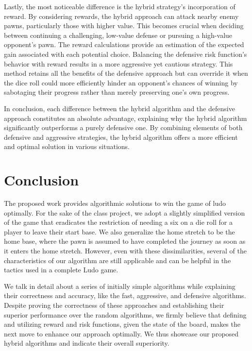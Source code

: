 \documentclass{article} %
\begin{document}
Lastly, the most noticeable difference is the hybrid strategy's incorporation of reward. By considering rewards, the hybrid approach can attack nearby enemy pawns, particularly those with higher value. This becomes crucial when deciding between continuing a challenging, low-value defense or pursuing a high-value opponent's pawn. The reward calculations provide an estimation of the expected gain associated with each potential choice. Balancing the defensive risk function's behavior with reward results in a more aggressive yet cautious strategy. This method retains all the benefits of the defensive approach but can override it when the dice roll could more efficiently hinder an opponent's chances of winning by sabotaging their progress rather than merely preserving one's own progress.

In conclusion, each difference between the hybrid algorithm and the defensive approach constitutes an absolute advantage, explaining why the hybrid algorithm significantly outperforms a purely defensive one. By combining elements of both defensive and aggressive strategies, the hybrid algorithm offers a more efficient and optimal solution in various situations.




\section{Conclusion}
The proposed work provides algorithmic solutions to win the game of ludo optimally. For the sake of the class project, we adopt a slightly simplified version of the game that eradicates the restriction of needing a six on a die roll for a player to leave their start base. We also generalize the home stretch to be the home base, where the pawn is assumed to have completed the journey as soon as it enters the home stretch. However, even with these dissimilarities, several of the characteristics of our algorithm are still applicable and can be helpful in the tactics used in a complete Ludo game.

We talk in detail about a series of initially simple algorithms while explaining their correctness and accuracy, like the fast, aggressive, and defensive algorithms. Despite proving the correctness of these approaches and establishing their superior performance over the random algorithms, we firmly believe that defining and utilizing reward and risk functions, given the state of the board, makes the next move to enhance our approach optimally. We thus showcase our proposed hybrid algorithms and indicate their overall superiority.
\end{document}
